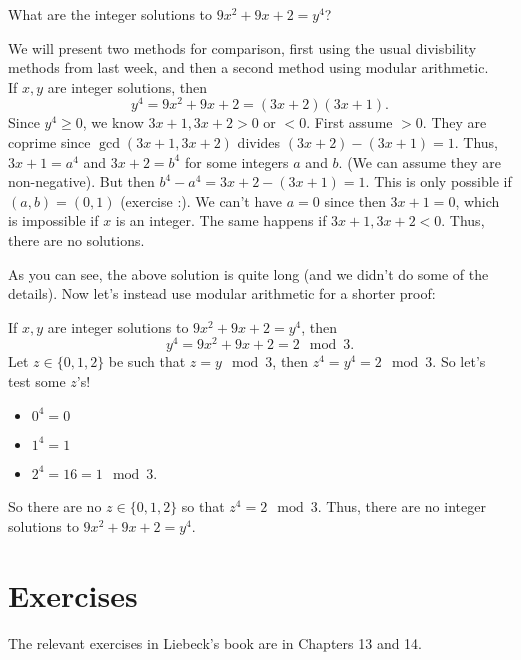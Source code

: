 \documentclass[11pt,dvipsnames]{book}
\numberwithin{figure}{section} %
\numberwithin{table}{section} %
\begin{document}
\begin{example}
What are the integer solutions to $9x^{2}+9x+2=y^{4}$?

 We will present two methods for comparison, first using the usual divisbility methods from last week, and then a second method using modular arithmetic.\\

  If $x,y$ are integer solutions, then
\[
y^{4}=9x^{2}+9x+2 =(3x+2)(3x+1).
\]
 Since $y^{4}\geq 0$, we know $3x+1,3x+2> 0$ or $<0$.  First assume $>0$.   They are coprime since $\gcd(3x+1,3x+2)$ divides $ (3x+2)-(3x+1)=1$.   Thus, $3x+1=a^{4}$ and $3x+2=b^{4}$ for some integers $a$ and $b$.   (We can assume they are non-negative). But then $b^{4}-a^{4} =3x+2-(3x+1) =1$.   This is only possible if $(a,b)=(0,1)$  (exercise :). We can't have $a=0$ since then $3x+1=0$,  which is impossible if $x$ is an integer. The same happens if $3x+1,3x+2<0$.  Thus, there are no solutions.

\vspace{10pt}

As you can see, the above solution is quite long (and we didn't do some of the details). Now let's instead use modular arithmetic for a shorter proof:

 \vspace{10pt}

 If $x,y$ are integer solutions to $9x^{2}+9x+2=y^{4}$, then
\[
y^{4}=9x^{2}+9x+2
 = 2\mod 3.
\]
Let $z\in \{0,1,2\}$ be such that $z = y\mod 3$, then   $z^{4} = y^{4} = 2\mod 3$.
 So let's test some $z$'s!
\begin{itemize}
\item $0^{4}=0$
\item $1^{4}=1$
\item $2^{4}=16 = 1 \mod 3$.
\end{itemize}
So there are no $z\in \{0,1,2\}$ so that $z^{4} = 2 \mod 3$.  Thus, there are no integer solutions to $9x^{2}+9x+2=y^{4}$.

\end{example}

\section{Exercises}%
\label{modularexercises}

The relevant exercises in Liebeck's book are in Chapters 13 and 14.
\end{document}

